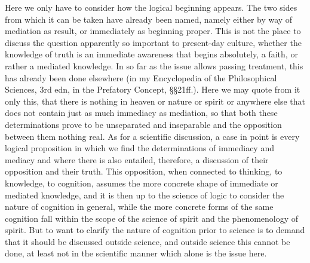 Here we only have to consider how the logical beginning appears.
The two sides from which it can be taken have already been named,
namely either by way of mediation as result,
or immediately as beginning proper.
This is not the place to discuss the question
apparently so important to present-day culture,
whether the knowledge of truth is
an immediate awareness that begins absolutely, a faith,
or rather a mediated knowledge.
In so far as the issue allows passing treatment,
this has already been done elsewhere
(in my Encyclopedia of the Philosophical Sciences, 3rd edn, in the
Prefatory Concept, §§21ff.).
Here we may quote from it only this,
that there is nothing in heaven or nature or spirit or anywhere else
that does not contain just as much immediacy as mediation,
so that both these determinations prove to be unseparated and inseparable
and the opposition between them nothing real.
As for a scientific discussion, a case in point is
every logical proposition in which we find
the determinations of immediacy and mediacy
and where there is also entailed, therefore,
a discussion of their opposition and their truth.
This opposition, when connected to thinking,
to knowledge, to cognition,
assumes the more concrete shape
of immediate or mediated knowledge,
and it is then up to the science of logic to consider
the nature of cognition in general,
while the more concrete forms of
the same cognition fall within the scope of
the science of spirit and the phenomenology of spirit.
But to want to clarify the nature of cognition prior to science
is to demand that it should be discussed outside science,
and outside science this cannot be done,
at least not in the scientific manner
which alone is the issue here.


